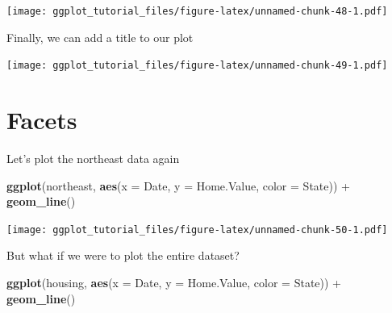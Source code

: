 \documentclass[]{article}
\newenvironment{Shaded}{\begin{snugshade}}{\end{snugshade}}
\newcommand{\KeywordTok}[1]{\textcolor[rgb]{0.13,0.29,0.53}{\textbf{{#1}}}}
\newcommand{\DataTypeTok}[1]{\textcolor[rgb]{0.13,0.29,0.53}{{#1}}}
\newcommand{\StringTok}[1]{\textcolor[rgb]{0.31,0.60,0.02}{{#1}}}
\newcommand{\NormalTok}[1]{{#1}}
\theoremstyle{definition}
\theoremstyle{definition}
\theoremstyle{definition}
\theoremstyle{remark}
\begin{document}
\texttt{[image: ggplot\_tutorial\_files/figure-latex/unnamed-chunk-48-1.pdf]}

Finally, we can add a title to our plot

\begin{Shaded}
\end{Shaded}

\texttt{[image: ggplot\_tutorial\_files/figure-latex/unnamed-chunk-49-1.pdf]}

\section{Facets}\label{facets}

Let's plot the northeast data again

\begin{Shaded}
\begin{Highlighting}[]
\KeywordTok{ggplot}\NormalTok{(northeast, }\KeywordTok{aes}\NormalTok{(}\DataTypeTok{x =} \NormalTok{Date, }\DataTypeTok{y =} \NormalTok{Home.Value, }\DataTypeTok{color =} \NormalTok{State)) +}
\StringTok{  }\KeywordTok{geom_line}\NormalTok{()}
\end{Highlighting}
\end{Shaded}

\texttt{[image: ggplot\_tutorial\_files/figure-latex/unnamed-chunk-50-1.pdf]}

But what if we were to plot the entire dataset?

\begin{Shaded}
\begin{Highlighting}[]
\KeywordTok{ggplot}\NormalTok{(housing, }\KeywordTok{aes}\NormalTok{(}\DataTypeTok{x =} \NormalTok{Date, }\DataTypeTok{y =} \NormalTok{Home.Value, }\DataTypeTok{color =} \NormalTok{State)) +}
\StringTok{  }\KeywordTok{geom_line}\NormalTok{()}
\end{Highlighting}
\end{Shaded}
\end{document}
